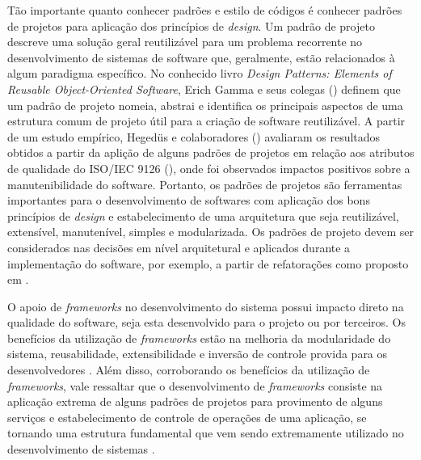 Tão importante quanto conhecer padrões e estilo de códigos é conhecer padrões de projetos para aplicação dos princípios de \emph{design}.
%
Um padrão de projeto descreve uma solução geral reutilizável para um problema recorrente no desenvolvimento de sistemas de software que, geralmente, estão relacionados à algum paradigma específico.
%
No conhecido livro \emph{Design Patterns: Elements of Reusable Object-Oriented Software}, Erich Gamma e seus colegas (\citeyear{gof1994}) definem que um padrão de projeto nomeia, abstrai e identifica os principais aspectos de uma estrutura comum de projeto útil para a criação de software reutilizável.
%
A partir de um estudo empírico, Hegedüs e colaboradores (\citeyear{hegedus2012}) avaliaram os resultados obtidos a partir da aplição de alguns padrões de projetos em relação aos atributos de qualidade do ISO/IEC 9126 (\citeyear{iso9126}), onde foi observados impactos positivos sobre a manutenibilidade do software.
%
Portanto, os padrões de projetos são ferramentas importantes para o desenvolvimento de softwares com aplicação dos bons princípios de \emph{design} e estabelecimento de uma arquitetura que seja reutilizável, extensível, manutenível, simples e modularizada.
%
Os padrões de projeto devem ser considerados nas decisões em nível arquitetural e aplicados durante a implementação do software, por exemplo, a partir de refatorações como proposto em \cite{kerievsky2008}.


O apoio de \emph{frameworks} no desenvolvimento do sistema possui impacto direto na qualidade do software, seja esta desenvolvido para o projeto ou por terceiros.
%
Os benefícios da utilização de \emph{frameworks} estão na melhoria da modularidade do sistema, reusabilidade, extensibilidade e inversão de controle provida para os desenvolvedores \cite{fayad1997}.
%
Além disso, corroborando os benefícios da utilização de \emph{frameworks}, vale ressaltar que o desenvolvimento de \emph{frameworks} consiste na aplicação extrema de alguns padrões de projetos para provimento de alguns serviços e estabelecimento de controle de operações de uma aplicação, se tornando uma estrutura fundamental que vem sendo extremamente utilizado no desenvolvimento de sistemas \cite{fayad1997}.

%


